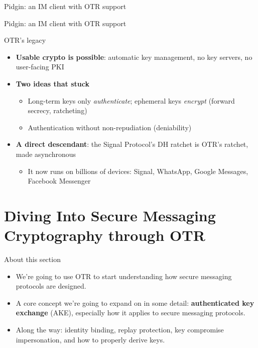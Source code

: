 \ifdefined\PRESENTATION\else\PassOptionsToClass{handout}{beamer}\fi\documentclass[aspectratio=169, lualatex]{beamer}
\begin{document}
\begin{frame}{Pidgin: an IM client with OTR support}
\end{frame}

\begin{frame}{Pidgin: an IM client with OTR support}
\end{frame}

\begin{frame}{OTR's legacy}
	\begin{itemize}
		\item \textbf{Usable crypto is possible}: automatic key management, no key servers, no user-facing PKI
		\item \textbf{Two ideas that stuck}
		      \begin{itemize}
			      \item Long-term keys only \textit{authenticate}; ephemeral keys \textit{encrypt} (forward secrecy, ratcheting)
			      \item Authentication without non-repudiation (deniability)
		      \end{itemize}
		\item \textbf{A direct descendant}: the Signal Protocol's DH ratchet is OTR's ratchet, made asynchronous
		      \begin{itemize}
			      \item It now runs on billions of devices: Signal, WhatsApp, Google Messages, Facebook Messenger
		      \end{itemize}
	\end{itemize}
\end{frame}

\section{Diving Into Secure Messaging Cryptography through OTR}

\begin{frame}{About this section}
	\begin{itemize}
		\item We're going to use OTR to start understanding how secure messaging protocols are designed.
		\item A core concept we're going to expand on in some detail: \textbf{authenticated key exchange} (AKE), especially how it applies to secure messaging protocols.
		\item Along the way: identity binding, replay protection, key compromise impersonation, and how to properly derive keys.
	\end{itemize}
\end{frame}
\end{document}
